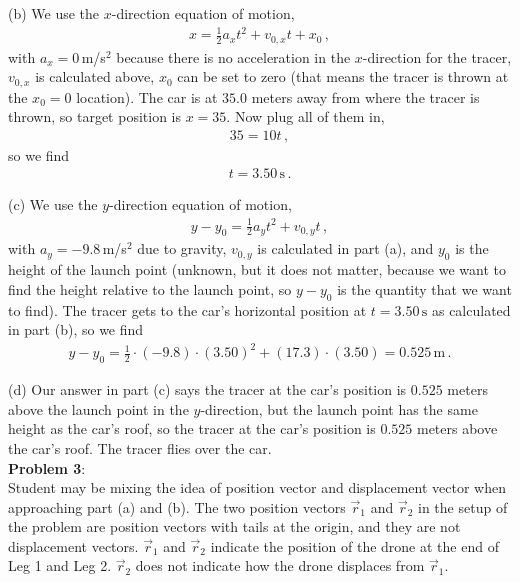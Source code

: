 \documentclass[11pt, onesided]{book}
\theoremstyle{break}
\theoremstyle{break}
\begin{document}
(b) We use the $x$-direction equation of motion, 
\begin{align*}
x = \frac{1}{2}a_x t^2 + v_{0,x} t+ x_0\,,
\end{align*}
with $a_x = 0\,$m/s$^2$ because there is no acceleration in the $x$-direction for the tracer, $v_{0,x}$ is calculated above, $x_0$ can be set to zero (that means the tracer is thrown at the $x_0=0$ location). The car is at $35.0$ meters away from where the tracer is thrown, so target position is $x = 35$. Now plug all of them in,
\begin{align*}
35 = 10 t\,,
\end{align*}
so we find
\begin{align*}
t = 3.50\,\text{s}\,.
\end{align*}


(c) We use the $y$-direction equation of motion, 
\begin{align*}
y-y_0 = \frac{1}{2}a_y t^2 + v_{0,y} t\,,
\end{align*}
with $a_y = -9.8\,$m/s$^2$ due to gravity, $v_{0,y}$ is calculated in part (a), and $y_0$ is the height of the launch point (unknown, but it does not matter, because we want to find the height relative to the launch point, so $y-y_0$ is the quantity that we want to find). The tracer gets to the car's horizontal position at $t = 3.50\,\text{s}$ as calculated in part (b), so we find
\begin{align*}
y-y_0 = \frac{1}{2}\cdot (-9.8) \cdot (3.50)^2 + (17.3)\cdot (3.50)=0.525\,\text{m}\,.
\end{align*}

(d) Our answer in part (c) says the tracer at the car's position is $0.525$ meters above the launch point in the $y$-direction, but the launch point has the same height as the car's roof, so the tracer at the car's position is $0.525$ meters above the car's roof. The tracer flies over the car.\\

\newpage
\noindent \textbf{Problem 3}: \\

Student may be mixing the idea of position vector and displacement vector when approaching part (a) and (b). The two position vectors $\vec{r}_1$ and $\vec{r}_2$ in the setup of the problem are position vectors with tails at the origin, and they are not displacement vectors. $\vec{r}_1$ and $\vec{r}_2$ indicate the position of the drone at the end of Leg 1 and Leg 2. $\vec{r}_2$ does not indicate how the drone displaces from $\vec{r}_1$. \\
\end{document}
